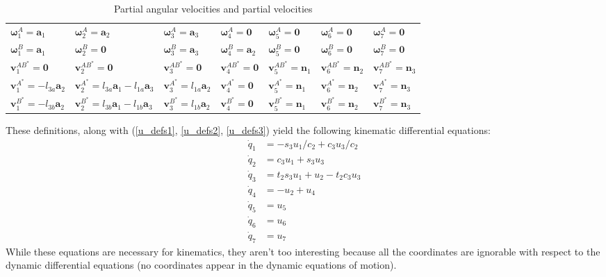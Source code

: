 \documentclass[letterpaper,11pt]{article}
\newcommand{\bs}[1]{ \boldsymbol{ #1 } }
\begin{document}
\begin{table}[!h]
  \begin{center}
    \begin{tabular}{lllllll}
      $\bs{\omega}^A_1 = \bs{a}_1$ & $\bs{\omega}^A_2 = \bs{a}_2$ &
      $\bs{\omega}^A_3 = \bs{a}_3$ & $\bs{\omega}^A_4 = \bs{0}$ &
      $\bs{\omega}^A_5 = \bs{0}$ & $\bs{\omega}^A_6 = \bs{0}$ &
      $\bs{\omega}^A_7 = \bs{0}$ \\
%
      $\bs{\omega}^B_1 = \bs{a}_1$ & $\bs{\omega}^B_2 = \bs{0}$ &
      $\bs{\omega}^B_3 = \bs{a}_3$ & $\bs{\omega}^B_4 = \bs{a}_2$ &
      $\bs{\omega}^B_5 = \bs{0}$ & $\bs{\omega}^B_6 = \bs{0}$ &
      $\bs{\omega}^B_7 = \bs{0}$ \\
%
      $\bs{v}^{AB^*}_1 = \bs{0}$ & $\bs{v}^{AB^*}_2 =
      \bs{0}$ & $\bs{v}^{AB^*}_3 = \bs{0}$ &
      $\bs{v}^{AB^*}_4 = \bs{0}$ & $\bs{v}^{AB^*}_5 = \bs{n}_1$ & $\bs{v}^{AB^*}_6
      = \bs{n}_2$ & $\bs{v}^{AB^*}_7 = \bs{n}_3$ \\
%
      $\bs{v}^{A^*}_1 = -l_{3a}\bs{a}_2$ & $\bs{v}^{A^*}_2 =
      l_{3a}\bs{a}_1 - l_{1a}\bs{a}_3$ & $\bs{v}^{A^*}_3 = l_{1a} \bs{a}_2$ &
      $\bs{v}^{A^*}_4 = \bs{0}$ & $\bs{v}^{A^*}_5 = \bs{n}_1$ & $\bs{v}^{A^*}_6
      = \bs{n}_2$ & $\bs{v}^{A^*}_7 = \bs{n}_3$ \\
%
        $\bs{v}^{B^*}_1 = -l_{3b}\bs{a}_2$ & $\bs{v}^{B^*}_2 = l_{3b}\bs{a}_1 -
        l_{1b}\bs{a}_3$ & $\bs{v}^{B^*}_3 = l_{1b} \bs{a}_2$ & $\bs{v}^{B^*}_4
        = \bs{0}$ & $\bs{v}^{B^*}_5 = \bs{n}_1$ & $\bs{v}^{B^*}_6 = \bs{n}_2$ &
        $\bs{v}^{B^*}_7 = \bs{n}_3$
%
    \end{tabular}
  \end{center}
  \caption{Partial angular velocities and partial velocities}
  \label{partialvelocities}
\end{table}

These definitions, along with (\ref{u_defs1}, \ref{u_defs2}, \ref{u_defs3})
yield the following kinematic differential equations:
\begin{align*}
  \dot{q}_1 &=  -s_3u_1/c_2 + c_3u_3/c_2\\
  \dot{q}_2 &=  c_3u_1 + s_3u_3 \\
  \dot{q}_3 &=  t_2s_3u_1 + u_2 - t_2c_3u_3 \\
  \dot{q}_4 &= -u_2 +  u_4 \\
  \dot{q}_5 &= u_5 \\
  \dot{q}_6 &= u_6 \\
  \dot{q}_7 &= u_7
\end{align*}
While these equations are necessary for kinematics, they aren't too interesting
because all the coordinates are ignorable with respect to the dynamic
differential equations (no coordinates appear in the dynamic equations of
motion).
\end{document}
